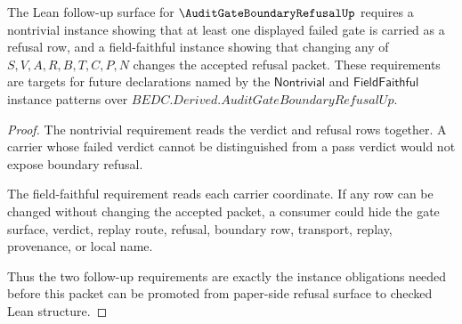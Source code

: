 

\begin{theorem}
\label{thm:audit-gate-boundary-refusal-follow-up-requirements}
The Lean follow-up surface for $\AuditGateBoundaryRefusalUp$ requires a nontrivial instance showing that at least one displayed failed gate is carried as a refusal row, and a field-faithful instance showing that changing any of $S,V,A,R,B,T,C,P,N$ changes the accepted refusal packet. These requirements are targets for future declarations named by the $\mathsf{Nontrivial}$ and $\mathsf{FieldFaithful}$ instance patterns over $BEDC.Derived.AuditGateBoundaryRefusalUp$.
\end{theorem}
\begin{proof}
The nontrivial requirement reads the verdict and refusal rows together. A carrier whose failed verdict cannot be distinguished from a pass verdict would not expose boundary refusal.

The field-faithful requirement reads each carrier coordinate. If any row can be changed without changing the accepted packet, a consumer could hide the gate surface, verdict, replay route, refusal, boundary row, transport, replay, provenance, or local name.

Thus the two follow-up requirements are exactly the instance obligations needed before this packet can be promoted from paper-side refusal surface to checked Lean structure.
\end{proof}


